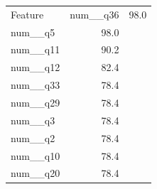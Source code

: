 \begin{tabular}{lr}
\toprule
Feature & %
\midrule
num__q36 & 98.0 \\
num__q5 & 98.0 \\
num__q11 & 90.2 \\
num__q12 & 82.4 \\
num__q33 & 78.4 \\
num__q29 & 78.4 \\
num__q3 & 78.4 \\
num__q2 & 78.4 \\
num__q10 & 78.4 \\
num__q20 & 78.4 \\
\bottomrule
\end{tabular}
